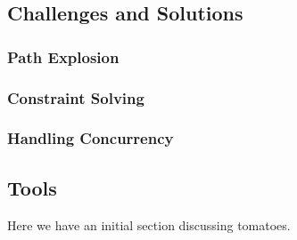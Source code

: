 \documentclass[11pt, journal]{IEEEtran}
\begin{document}
\subsection{Challenges and Solutions}
\subsubsection{Path Explosion}
\subsubsection{Constraint Solving}
\subsubsection{Handling Concurrency}
\subsection{Tools}
Here we have an initial section discussing tomatoes.



\end{document}
